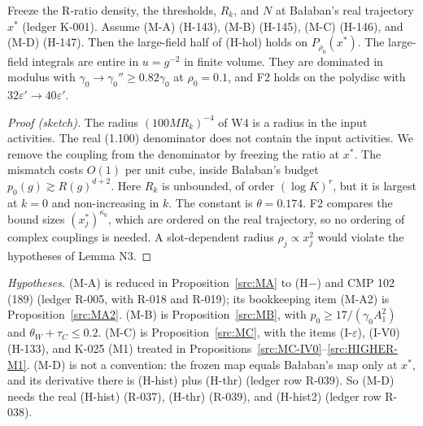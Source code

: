 \begin{proposition}\label{src:HHOL-LF}
Freeze the R-ratio density, the thresholds, $R_k$, and $N$ at Ba{\l}aban's real trajectory $x^*$ (ledger K-001). Assume (M-A) (H-143), (M-B) (H-145), (M-C) (H-146), and (M-D) (H-147). Then the large-field half of (H-hol) holds on $P_{\rho_0}(x^*)$. The large-field integrals are entire in $u=g^{-2}$ in finite volume. They are dominated in modulus with $\gamma_0\to\gamma_0''\ge0.82\gamma_0$ at $\rho_0=0.1$, and F2 holds on the polydisc with $32\varepsilon'\to40\varepsilon'$.
\end{proposition}
\begin{proof}[Proof (sketch)]
The radius $(100MR_k)^{-4}$ of W4 is a radius in the input activities. The real (1.100) denominator does not contain the input activities. We remove the coupling from the denominator by freezing the ratio at $x^*$. The mismatch costs $O(1)$ per unit cube, inside Ba{\l}aban's budget $p_0(g)\gtrsim R(g)^{d+2}$. Here $R_k$ is unbounded, of order $(\log K)^r$, but it is largest at $k=0$ and non-increasing in $k$. The constant is $\theta=0.174$. F2 compares the bound sizes $(x^*_j)^{\kappa_0}$, which are ordered on the real trajectory, so no ordering of complex couplings is needed. A slot-dependent radius $\rho_j\propto x_j^2$ would violate the hypotheses of Lemma N3.
\end{proof}
\emph{Hypotheses.} (M-A) is reduced in Proposition~\ref{src:MA} to (H$-$) and CMP 102 (189) (ledger R-005, with R-018 and R-019); its bookkeeping item (M-A2) is Proposition~\ref{src:MA2}. (M-B) is Proposition~\ref{src:MB}, with $p_0\ge17/(\gamma_0A_1^2)$ and $\theta_W+\tau_C\le0.2$. (M-C) is Proposition~\ref{src:MC}, with the items (I-$\varepsilon$), (I-V0) (H-133), and K-025 (M1) treated in Propositions~\ref{src:MC-IV0}--\ref{src:HIGHER-M1}. (M-D) is not a convention: the frozen map equals Ba{\l}aban's map only at $x^*$, and its derivative there is (H-hist) plus (H-thr) (ledger row R-039). So (M-D) needs the real (H-hist) (R-037), (H-thr) (R-039), and (H-hist2) (ledger row R-038).

